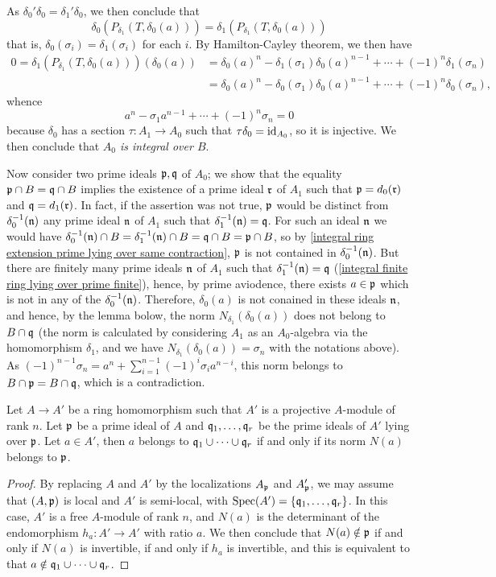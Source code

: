 As $\delta_0'\delta_0=\delta_1'\delta_0$, we then conclude that
\[\delta_0(P_{\delta_1}(T,\delta_0(a)))=\delta_1(P_{\delta_1}(T,\delta_0(a)))\]
that is, $\delta_0(\sigma_i)=\delta_1(\sigma_i)$ for each $i$. By Hamilton-Cayley theorem, we then have
\begin{align*}
0=\delta_1(P_{\delta_1}(T,\delta_0(a)))(\delta_0(a))&=\delta_0(a)^n-\delta_1(\sigma_1)\delta_0(a)^{n-1}+\cdots+(-1)^{n}\delta_1(\sigma_n)\\
&=\delta_0(a)^n-\delta_0(\sigma_1)\delta_0(a)^{n-1}+\cdots+(-1)^{n}\delta_0(\sigma_n),
\end{align*}
whence
\[a^n-\sigma_1a^{n-1}+\cdots+(-1)^{n}\sigma_n=0\]
because $\delta_0$ has a section $\tau:A_1\to A_0$ such that $\tau\delta_0=\operatorname{id}_{A_0}$, so it is injective. We then conclude that \textit{$A_0$ is integral over $B$}.\par
Now consider two prime ideals $\mathfrak{p},\mathfrak{q}$ of $A_0$; we show that the equality $\mathfrak{p}\cap B=\mathfrak{q}\cap B$ implies the existence of a prime ideal $\mathfrak{r}$ of $A_1$ such that $\mathfrak{p}=d_0(\mathfrak{r})$ and $\mathfrak{q}=d_1(\mathfrak{r})$. In fact, if the assertion was not true, $\mathfrak{p}$ would be distinct from $\delta_0^{-1}(\mathfrak{n})$ any prime ideal $\mathfrak{n}$ of $A_1$ such that $\delta_1^{-1}(\mathfrak{n})=\mathfrak{q}$. For such an ideal $\mathfrak{n}$ we would have $\delta_0^{-1}(\mathfrak{n})\cap B=\delta_1^{-1}(\mathfrak{n})\cap B=\mathfrak{q}\cap B=\mathfrak{p}\cap B$, so by \cref{integral ring extension prime lying over same contraction}, $\mathfrak{p}$ is not contained in $\delta_0^{-1}(\mathfrak{n})$. But there are finitely many prime ideals $\mathfrak{n}$ of $A_1$ such that $\delta_1^{-1}(\mathfrak{n})=\mathfrak{q}$ (\cref{integral finite ring lying over prime finite}), hence, by prime aviodence, there exists $a\in\mathfrak{p}$ which is not in any of the $\delta_0^{-1}(\mathfrak{n})$. Therefore, $\delta_0(a)$ is not conained in these ideals $\mathfrak{n}$, and hence, by the lemma bolow, the norm $N_{\delta_1}(\delta_0(a))$ does not belong to $B\cap\mathfrak{q}$ (the norm is calculated by considering $A_1$ as an $A_0$-algebra via the homomorphism $\delta_1$, and we have $N_{\delta_1}(\delta_0(a))=\sigma_n$ with the notations above). As $(-1)^{n-1}\sigma_n=a^n+\sum_{i=1}^{n-1}(-1)^i\sigma_ia^{n-i}$, this norm belongs to $B\cap\mathfrak{p}=B\cap\mathfrak{q}$, which is a contradiction.

\begin{lemma}\label{ring homomorphism lying over prime iff norm belong to p}
Let $A\to A'$ be a ring homomorphism such that $A'$ is a projective $A$-module of rank $n$. Let $\mathfrak{p}$ be a prime ideal of $A$ and $\mathfrak{q}_1,\dots,\mathfrak{q}_r$ be the prime ideals of $A'$ lying over $\mathfrak{p}$. Let $a\in A'$, then $a$ belongs to $\mathfrak{q}_1\cup\cdots\cup\mathfrak{q}_r$ if and only if its norm $N(a)$ belongs to $\mathfrak{p}$.
\end{lemma}
\begin{proof}
By replacing $A$ and $A'$ by the localizations $A_{\mathfrak{p}}$ and $A'_{\mathfrak{p}}$, we may assume that $(A,\mathfrak{p})$ is local and $A'$ is semi-local, with $\mathrm{Spec}(A')=\{\mathfrak{q}_1,\dots,\mathfrak{q}_r\}$. In this case, $A'$ is a free $A$-module of rank $n$, and $N(a)$ is the determinant of the endomorphism $h_a:A'\to A'$ with ratio $a$. We then conclude that $N(a)\notin\mathfrak{p}$ if and only if $N(a)$ is invertible, if and only if $h_a$ is invertible, and this is equivalent to that $a\notin\mathfrak{q}_1\cup\cdots\cup\mathfrak{q}_r$. 
\end{proof}

